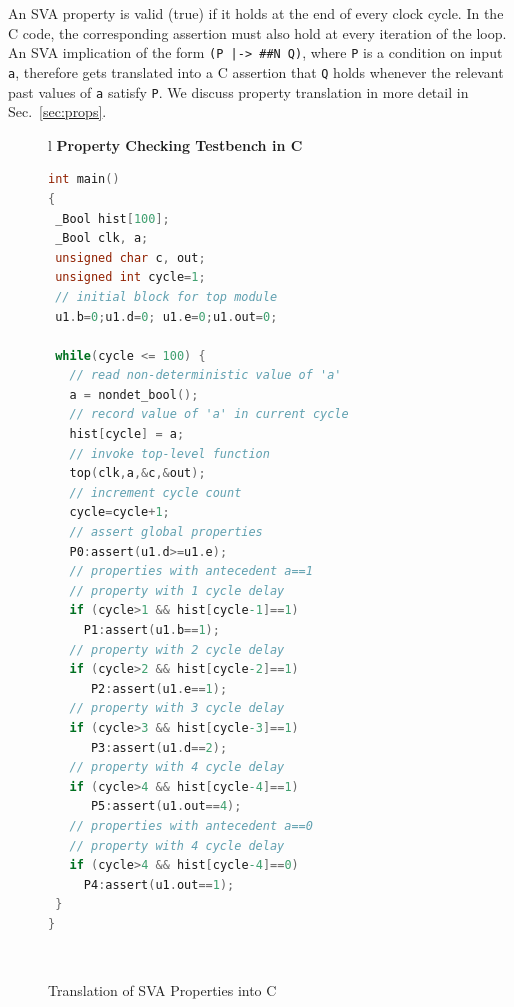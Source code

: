 An SVA property is valid (true) if it holds at the end of every clock cycle. In the C code, the corresponding assertion must also hold at every iteration of the loop. An SVA implication of the form \texttt{(P |-> \#\#N Q)}, where \texttt{P} is a condition on input \texttt{a}, therefore gets translated into a C assertion that \texttt{Q} holds whenever the relevant past values of \texttt{a} satisfy \texttt{P}. We discuss property translation in more detail in Sec.~\ref{sec:props}.



\begin{figure}[bth]
\small
\begin{center}
\begin{tabular}{l}
\hline\noalign{\vskip0.25ex}
\textbf{Property Checking Testbench in C} \\
\hline
\begin{lstlisting}[boxpos=t,mathescape=true,language=C,basicstyle=\scriptsize\ttfamily]
int main() 
{
 _Bool hist[100];
 _Bool clk, a;
 unsigned char c, out;
 unsigned int cycle=1;
 // initial block for top module
 u1.b=0;u1.d=0; u1.e=0;u1.out=0; 
 
 while(cycle <= 100) {
   // read non-deterministic value of 'a'
   a = nondet_bool(); 
   // record value of 'a' in current cycle
   hist[cycle] = a;
   // invoke top-level function
   top(clk,a,&c,&out);
   // increment cycle count
   cycle=cycle+1; 
   // assert global properties 
   P0:assert(u1.d>=u1.e);
   // properties with antecedent a==1 
   // property with 1 cycle delay
   if (cycle>1 && hist[cycle-1]==1) 
     P1:assert(u1.b==1);
   // property with 2 cycle delay
   if (cycle>2 && hist[cycle-2]==1)
      P2:assert(u1.e==1); 
   // property with 3 cycle delay
   if (cycle>3 && hist[cycle-3]==1)
      P3:assert(u1.d==2); 
   // property with 4 cycle delay
   if (cycle>4 && hist[cycle-4]==1)
      P5:assert(u1.out==4); 
   // properties with antecedent a==0
   // property with 4 cycle delay
   if (cycle>4 && hist[cycle-4]==0) 
     P4:assert(u1.out==1);
 }
}
\end{lstlisting}\\
\hline
\end{tabular}
\caption{Translation of SVA Properties into C}
\label{fig:sva}
\end{center}
\end{figure}

